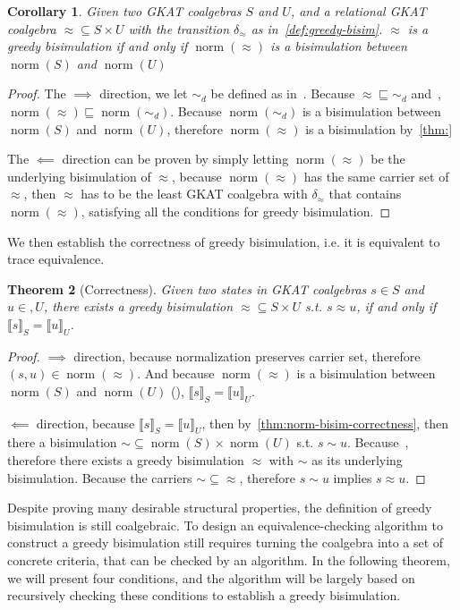 \documentclass[conference]{IEEEtran}
\newtheorem{theorem}{Theorem}
\newtheorem{corollary}[theorem]{Corollary}
\DeclareMathOperator{\norm}{\mathrm{norm}}
\begin{document}
\begin{corollary}\label{thm:greedy-bisim-iff-norm-bisim}
    Given two GKAT coalgebras \(S\) and \(U\), and a relational GKAT coalgebra \({≈} ⊆ S × U\) with the transition \(δ_≈\) as in~\cref{def:greedy-bisim}.
    \(≈\) is a greedy bisimulation if and only if \(\norm(≈)\) is a bisimulation between \(\norm(S)\) and \(\norm(U)\)
\end{corollary}

\begin{proof}
    The \(⟹\) direction, we let \(∼_d\) be defined as in~.
    Because \({≈} ⊑ {∼_d}\) and~, \(\norm(≈) ⊑ \norm(∼_d)\). 
    Because \(\norm(∼_d)\) is a bisimulation between \(\norm(S)\) and \(\norm(U)\), therefore \(\norm(≈)\) is a bisimulation by~\cref{thm:}

    The \(⟸\) direction can be proven by simply letting \(\norm(≈)\) be the underlying bisimulation of \(≈\), because \(\norm(≈)\) has the same carrier set of \(≈\), then \(≈\) has to be the least GKAT coalgebra with \(δ_≈\) that contains \(\norm(≈)\), satisfying all the conditions for greedy bisimulation.
\end{proof}

We then establish the correctness of greedy bisimulation, i.e. it is equivalent to trace equivalence.

\begin{theorem}[Correctness]
    Given two states in GKAT coalgebras \(s ∈ S\) and \(u ∈ ,U\), there exists a greedy bisimulation \({≈} ⊆ S × U\) s.t. \(s ≈ u\), if and only if \(⟦s⟧_S = ⟦u⟧_U\).
\end{theorem}

\begin{proof}
    \(⟹\) direction, because normalization preserves carrier set, therefore \((s, u) ∈ \norm(≈)\).
    And because \(\norm(≈)\) is a bisimulation between \(\norm(S)\) and \(\norm(U)\) (), \(⟦s⟧_S = ⟦u⟧_U\).

    \(⟸\) direction, because \(⟦s⟧_S = ⟦u⟧_U\), then by~\cref{thm:norm-bisim-correctness}, then there a bisimulation \(∼ ⊆ \norm(S) × \norm(U)\) s.t. \(s ∼ u\). 
    Because~, therefore there exists a greedy bisimulation \(≈\) with \(∼\) as its underlying bisimulation. 
    Because the carriers \({∼} ⊆ {≈}\), therefore \(s ∼ u\) implies \(s ≈ u\).
\end{proof}

Despite proving many desirable structural properties, the definition of greedy bisimulation is still coalgebraic.
To design an equivalence-checking algorithm to construct a greedy bisimulation still requires turning the coalgebra into a set of concrete criteria, that can be checked by an algorithm.
In the following theorem, we will present four conditions, and the algorithm will be largely based on recursively checking these conditions to establish a greedy bisimulation.
\end{document}
